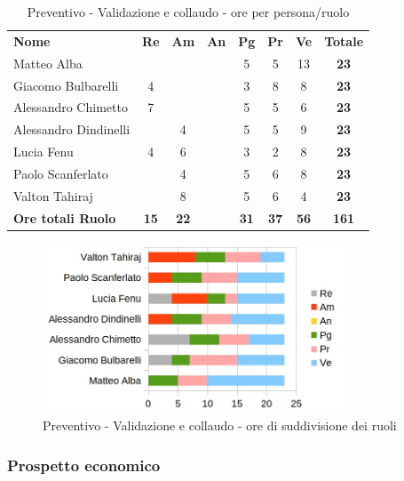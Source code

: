 		\begin{table} [h!]
			\begin{center}
				\begin{tabular} { m{3.5cm} c c c c c c c }
					\rowcolor{lightgray}
					\textbf{Nome} & \textbf{Re} & \textbf{Am} & \textbf{An} & \textbf{Pg} & \textbf{Pr} & \textbf{Ve} & \textbf{Totale} \\
					Matteo Alba & & & & 5 & 5 & 13 & \textbf{23} \\
					Giacomo Bulbarelli & 4 & & & 3 & 8 & 8 & \textbf{23} \\
					Alessandro Chimetto & 7 & & & 5 & 5 & 6 & \textbf{23} \\
					Alessandro Dindinelli & & 4 & & 5 & 5 & 9 & \textbf{23} \\
					Lucia Fenu & 4 & 6 & & 3 & 2 & 8 & \textbf{23} \\
					Paolo Scanferlato & & 4 & & 5 & 6 & 8 & \textbf{23} \\
					Valton Tahiraj & & 8 & & 5 & 6 & 4 & \textbf{23} \\
					\textbf{Ore totali Ruolo} & \textbf{15} & \textbf{22} & \textbf{} & \textbf{31} & \textbf{37}& \textbf{56} & \textbf{161}
				\end{tabular}
				\caption{Preventivo - Validazione e collaudo - ore per persona/ruolo}
			\end{center}
		\end{table}
	
		\begin{figure} [h!]
			\centering
			\includegraphics[width=0.8\textwidth]{res/img/grafici/validazione_e_collaudo_ore_ruolo.jpg}
			\caption{Preventivo - Validazione e collaudo - ore di suddivisione dei ruoli} 
		\end{figure}
	
	\newpage
	
	\subsubsection{Prospetto economico}
	
